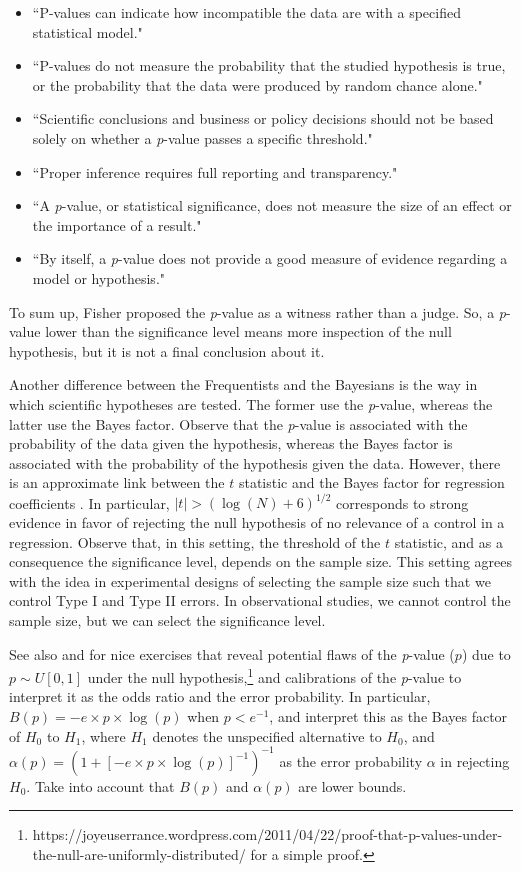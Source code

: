 \begin{itemize}
	\item ``P-values can indicate how incompatible the data are with a specified statistical model."
	\item ``P-values do not measure the probability that the studied hypothesis is true, or the probability that the data were produced by random chance alone."
	\item ``Scientific conclusions and business or policy decisions should not be based solely on whether a \textit{p}-value passes a specific threshold."
	\item ``Proper inference requires full reporting and transparency."
	\item ``A \textit{p}-value, or statistical significance, does not measure the size of an effect or the importance of a result."
	\item ``By itself, a \textit{p}-value does not provide a good measure of evidence regarding a model or hypothesis."
\end{itemize}

To sum up, Fisher proposed the \textit{p}-value as a witness rather than a judge. So, a \textit{p}-value lower than the significance level means more inspection of the null hypothesis, but it is not a final conclusion about it.

Another difference between the Frequentists and the Bayesians is the way in which scientific hypotheses are tested. The former use the \textit{p}-value, whereas the latter use the Bayes factor. Observe that the \textit{p}-value is associated with the probability of the data given the hypothesis, whereas the Bayes factor is associated with the probability of the hypothesis given the data. However, there is an approximate link between the $t$ statistic and the Bayes factor for regression coefficients \cite{Raftery1995}. In particular, $|t|>(\log(N)+6)^{1/2}$ corresponds to strong evidence in favor of rejecting the null hypothesis of no relevance of a control in a regression. Observe that, in this setting, the threshold of the $t$ statistic, and as a consequence the significance level, depends on the sample size. This setting agrees with the idea in experimental designs of selecting the sample size such that we control Type I and Type II errors. In observational studies, we cannot control the sample size, but we can select the significance level.

See also \cite{sellke2001calibration} and \cite{benjamin2018redefine} for nice exercises that reveal potential flaws of the \textit{p}-value ($p$) due to $p \sim U[0,1]$ under the null hypothesis,\footnote{https://joyeuserrance.wordpress.com/2011/04/22/proof-that-p-values-under-the-null-are-uniformly-distributed/ for a simple proof.} and calibrations of the \textit{p}-value to interpret it as the odds ratio and the error probability. In particular, $B(p)=-e \times p \times \log(p)$ when $p < e^{-1}$, and interpret this as the Bayes factor of $H_0$ to $H_1$, where $H_1$ denotes the unspecified alternative to $H_0$, and $\alpha(p) = \left(1 + \left[-e \times p \times \log(p)\right]^{-1}\right)^{-1}$ as the error probability $\alpha$ in rejecting $H_0$. Take into account that $B(p)$ and $\alpha(p)$ are lower bounds.

